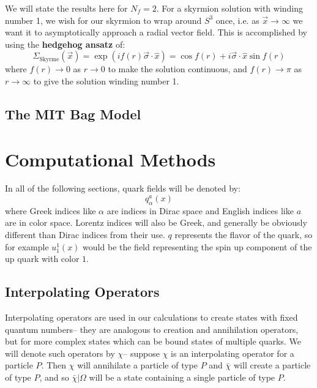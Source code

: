 \documentclass[11pt, oneside]{article}   	%
\theoremstyle{definition}
\begin{document}
We will state the results here for $N_f = 2$. For a skyrmion solution with winding number 1, we wish for our skyrmion to wrap around $S^3$ 
once, i.e. as $\vec x\rightarrow\infty$ we want it to asymptotically approach a radial vector field. This is accomplished by using the 
\textbf{hedgehog ansatz} of:
\begin{equation}
	\Sigma_\mathrm{Skyrme}(\vec x) = \exp(i f(r) \vec\sigma\cdot\hat x) = \cos f(r) + i \vec\sigma\cdot\hat x \sin f(r)
\end{equation}
where $f(r)\rightarrow 0$ as $r\rightarrow 0$ to make the solution continuous, and $f(r)\rightarrow\pi$ as $r\rightarrow\infty$ to give the 
solution winding number 1. 

\subsection{The MIT Bag Model}

\newpage
\section{Computational Methods}

In all of the following sections, quark fields will be denoted by:
\begin{equation}
	q_\alpha^a(x)
\end{equation}
where Greek indices like $\alpha$ are indices in Dirac space and English indices like $a$ are in color space. Lorentz indices will also be 
Greek, and generally be obviously different than Dirac indices from their use. $q$ represents the flavor of the quark, so for example $u_1^1(x)$ 
would be the field representing the spin up component of the up quark with color $1$.

\subsection{Interpolating Operators}

Interpolating operators are used in our calculations to create states with fixed quantum numbers-- they are analogous to creation and annihilation 
operators, but for more complex states which can be bound states of multiple quarks. We will denote such operators by $\chi$-- suppose 
$\chi$ is an interpolating operator for a particle $P$. Then $\chi$ will annihilate a particle of type $P$ and $\bar\chi$ will create a particle of type 
$P$, and so $\bar\chi |\Omega$ will be a state containing a single particle of type $P$. 
\end{document}
